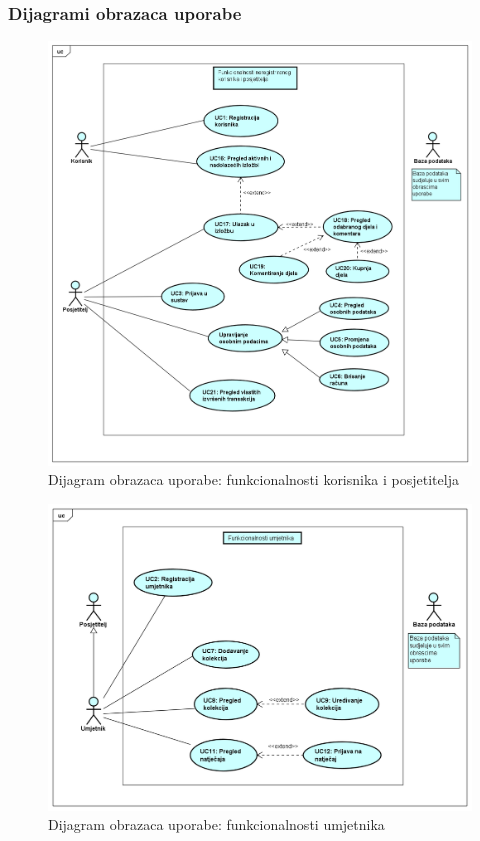 				\eject
			\subsubsection{Dijagrami obrazaca uporabe}

				
					\graphicspath{ {./slike/} }
				\begin{figure}[H]
					\includegraphics[width=\textwidth,height=\textheight,keepaspectratio]{uml_1}
					\caption{Dijagram obrazaca uporabe: funkcionalnosti korisnika i posjetitelja}
					
				\end{figure}
			
				\begin{figure}[H]
					\includegraphics[width=\textwidth,height=\textheight,keepaspectratio]{uml_2}
					\caption{Dijagram obrazaca uporabe: funkcionalnosti umjetnika}
					
				\end{figure}
			

